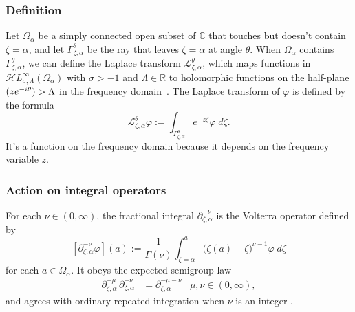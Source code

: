 \documentclass{article}
\theoremstyle{definition}
\theoremstyle{plain}
\newcommand{\R}{\mathbb{R}}
\newcommand{\C}{\mathbb{C}}
\let\Re\relax
\DeclareMathOperator{\Re}{Re}
\newcommand{\laplace}{\mathcal{L}}
\newcommand{\fracderiv}[3]{\partial^{#1}_{#2, #3}}
\newcommand{\singexp}[2]{\mathcal{H}L^\infty_{#1, #2}}
\newcommand{\domain}{\Omega}
\begin{document}
\subsubsection{Definition}
Let $\domain_\alpha$ be a simply connected open subset of $\C$ that touches but doesn't contain $\zeta=\alpha$, and let $\Gamma_{\zeta, \alpha}^\theta$ be the ray that leaves $\zeta=\alpha$ at angle $\theta$. When $\domain_\alpha$ contains $\Gamma_{\zeta, \alpha}^\theta$, we can define the Laplace transform $\laplace_{\zeta, \alpha}^{\theta}$, which maps functions in $\singexp{\sigma}{\Lambda}(\domain_\alpha)$ with $\sigma>-1$ and $\Lambda\in\R$ to holomorphic functions on the half-plane $\Re(z e^{-i\theta}) > \Lambda$ in the frequency domain~\cite[Section 5.6]{diverg-resurg-i}. The Laplace transform of $\varphi$ is defined by the formula
\begin{equation}\label{laplace:int} 
\laplace_{\zeta, \alpha}^{\theta} \varphi := \int_{\Gamma_{\zeta,\alpha}^\theta} e^{-z\zeta} \varphi\;d\zeta.
\end{equation}
It's a function on the frequency domain because it depends on the frequency variable $z$.
\subsubsection{Action on integral operators}\label{sec:L-int-op}
For each $\nu \in (0, \infty)$, the fractional integral $\partial^{-\nu}_{\zeta, \alpha}$ is the Volterra operator defined by
\[ [\partial^{-\nu}_{\zeta, \alpha} \varphi](a) := \frac{1}{\Gamma(\nu)} \int_{\zeta = \alpha}^a \big(\zeta(a)-\zeta\big)^{\nu-1} \varphi\;d\zeta \]
for each $a \in \domain_\alpha$. It obeys the expected semigroup law \cite[Section~1.3]{mladenov2014advanced}
\begin{align*}
\fracderiv{-\mu}{\zeta}{\alpha}\,\fracderiv{-\nu}{\zeta}{\alpha} & = \fracderiv{-\mu-\nu}{\zeta}{\alpha} & \mu, \nu \in (0, \infty),
\end{align*}
and agrees with ordinary repeated integration when $\nu$ is an integer \cite[Equation~35]{mladenov2014advanced}.
\end{document}
